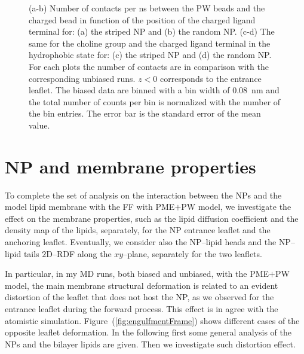 \begin{figure}[ht!]
{		}
		\caption{(a-b) Number of contacts per ns between the \acs{PW} beads and the charged bead in function of the position of the charged ligand terminal for: (a) the striped \acs{NP} and (b) the random \acs{NP}. (c-d) The same for the choline group and the charged ligand terminal in the hydrophobic state for: (c) the striped \ac{NP} and (d) the random \acs{NP}. For each plots the number of contacts are in comparison with the corresponding unbiased runs.  $z<0$ corresponds to the entrance leaflet. The biased data are binned with a bin width of $0.08$~nm and the total number of counts per bin is normalized with the number of the bin entries. The error bar is the standard error of the mean value.}%
		\label{fig:contactsUn}
\end{figure}

\clearpage
\section{NP and membrane properties}
To complete the set of analysis on the interaction between the \acp{NP} and the model lipid membrane with the \martini \ac{FF} with \ac{PME}$+$\ac{PW} model, we investigate the effect on the membrane properties, such as the lipid diffusion coefficient and the density map of the lipids, separately, for the \ac{NP} entrance leaflet and the anchoring leaflet. Eventually, we consider also the \ac{NP}--lipid heads and the \ac{NP}--lipid tails $2$D--\ac{RDF} along the $xy$--plane, separately for the two leaflets.

In particular, in my \ac{MD} runs, both biased and unbiased, with the \martini \ac{PME}$+$\ac{PW} model, the main membrane structural deformation is related to an evident distortion of the leaflet that does not host the \ac{NP}, as we observed for the entrance leaflet during the forward process. This effect is in agree with the atomistic simulation. Figure~(\ref{fig:engulfmentFrame}) shows different cases of the opposite leaflet deformation. In the following first some general analysis of the \acp{NP} and the bilayer lipids are given. Then we investigate such distortion effect.

